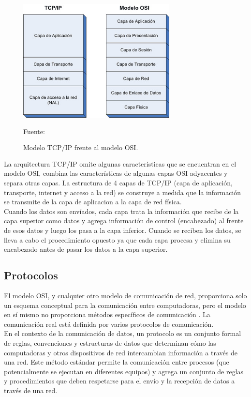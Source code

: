 \begin{figure}[H]
    \centering
    \includegraphics[width=8cm]{img/capitulo_2/tcp_ip_osi.jpg}\\
    \medskip
    \caption{Modelo TCP/IP frente al modelo OSI.\\}
    Fuente: \cite{tcpiposi}
    \label{fig:tcpip}
\end{figure}

La arquitectura TCP/IP omite algunas características que se encuentran en el modelo OSI, combina las características de algunas capas OSI adyacentes y separa otras capas. La estructura de 4 capas de TCP/IP (capa de aplicación, transporte, internet y acceso a la red) se construye a medida que la información se transmite de la capa de aplicacion a la capa de red física.\\

Cuando los datos son envíados, cada capa trata la información que recibe de la capa superior como datos y agrega información de control (encabezado) al frente de esos datos y luego los pasa a la capa inferior. Cuando se reciben los datos, se lleva a cabo el procedimiento opuesto ya que cada capa procesa y elimina su encabezado antes de pasar los datos a la capa superior.\\

\subsection{Protocolos}
El modelo OSI, y cualquier otro modelo de comunicación de red, proporciona solo un esquema conceptual para la comunicación entre computadoras, pero el modelo en sí mismo no proporciona métodos específicos de comunicación \cite{wikipedia:modeloosi}. La comunicación real está definida por varios protocolos de comunicación.\\

En el contexto de la comunicación de datos, un protocolo es un conjunto formal de reglas, convenciones y estructuras de datos que determinan cómo las computadoras y otros dispositivos de red intercambian información a través de una red. Este método estándar permite la comunicación entre procesos (que potencialmente se ejecutan en diferentes equipos) y agrega un conjunto de reglas y procedimientos que deben respetarse para el envío y la recepción de datos a través de una red.\\

